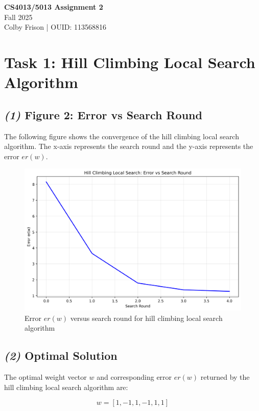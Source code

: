 \documentclass[11pt]{article}
\begin{document}
\begin{center}
\Large \textbf{CS4013/5013 Assignment 2}\\[0.5em]
\large Fall 2025\\[0.5em]
\normalsize Colby Frison | OUID: 113568816\\[1em]
\end{center}

\section*{Task 1: Hill Climbing Local Search Algorithm}

\subsection*{\textit{(1)} Figure 2: Error vs Search Round}

The following figure shows the convergence of the hill climbing local search algorithm. The x-axis represents the search round and the y-axis represents the error $er(w)$.

\begin{figure}[h!]
    \centering
    \includegraphics[width=0.75\linewidth]{../../local_search_error.png}
    \caption{Error $er(w)$ versus search round for hill climbing local search algorithm}
    \label{fig:local}
\end{figure}

\subsection*{\textit{(2)} Optimal Solution}

The optimal weight vector $w$ and corresponding error $er(w)$ returned by the hill climbing local search algorithm are:

\setcounter{equation}{2}
\begin{equation}
\label{eq:w_local}
w = [1, -1, 1, -1, 1, 1]
\end{equation}
\end{document}
